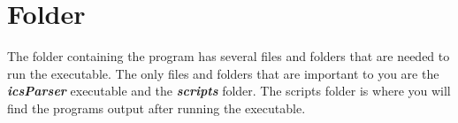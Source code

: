 \section*{Folder}
The folder containing the program has several files and folders that are needed to run the executable. The only files and folders that are important to you are the \textbf{\textit{icsParser}} executable and the \textbf{\textit{scripts}} folder. The scripts folder is where you will find the programs output after running the executable.
